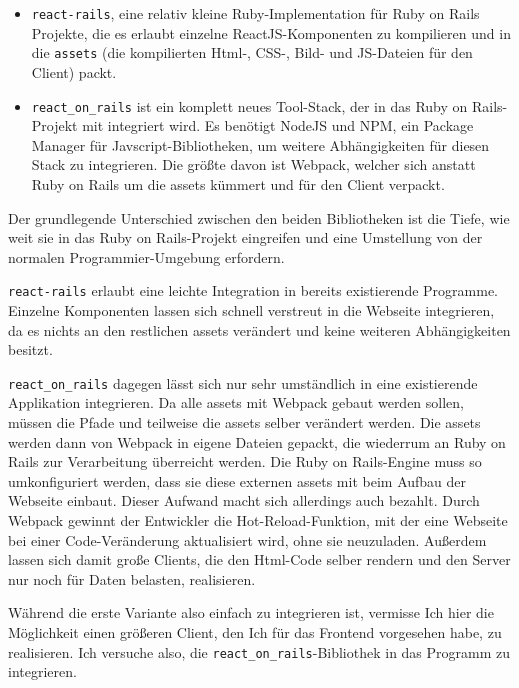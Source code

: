 \documentclass[a4paper,10pt]{scrartcl}
\begin{document}
  \begin{itemize}
    \item \lstinline{react-rails}, eine relativ kleine Ruby-Implementation für
      Ruby on Rails Projekte, die es erlaubt einzelne ReactJS-Komponenten zu
      kompilieren und in die \lstinline{assets} (die kompilierten Html-, CSS-,
      Bild- und JS-Dateien für den Client) packt.
    \item \lstinline{react_on_rails} ist ein komplett neues Tool-Stack, der in
      das Ruby on Rails-Projekt mit integriert wird.
      Es benötigt NodeJS und NPM, ein Package Manager für
      Javscript-Bibliotheken, um weitere Abhängigkeiten für diesen Stack zu
      integrieren.
      Die größte davon ist Webpack, welcher sich anstatt Ruby on Rails um die
      assets kümmert und für den Client verpackt.
  \end{itemize}

  Der grundlegende Unterschied zwischen den beiden Bibliotheken ist die Tiefe,
  wie weit sie in das Ruby on Rails-Projekt eingreifen und eine Umstellung von
  der normalen Programmier-Umgebung erfordern.

  \lstinline{react-rails} erlaubt eine leichte Integration in bereits
  existierende Programme.
  Einzelne Komponenten lassen sich schnell verstreut in die Webseite
  integrieren, da es nichts an den restlichen assets verändert und keine
  weiteren Abhängigkeiten besitzt.

  \lstinline{react_on_rails} dagegen lässt sich nur sehr umständlich in eine
  existierende Applikation integrieren.
  Da alle assets mit Webpack gebaut werden sollen, müssen die Pfade und
  teilweise die assets selber verändert werden.
  Die assets werden dann von Webpack in eigene Dateien gepackt, die wiederrum
  an Ruby on Rails zur Verarbeitung überreicht werden.
  Die Ruby on Rails-Engine muss so umkonfiguriert werden, dass sie diese
  externen assets mit beim Aufbau der Webseite einbaut.
  Dieser Aufwand macht sich allerdings auch bezahlt.
  Durch Webpack gewinnt der Entwickler die Hot-Reload-Funktion, mit der eine
  Webseite bei einer Code-Veränderung aktualisiert wird, ohne sie neuzuladen.
  Außerdem lassen sich damit große Clients, die den Html-Code selber rendern
  und den Server nur noch für Daten belasten, realisieren.

  Während die erste Variante also einfach zu integrieren ist, vermisse Ich hier
  die Möglichkeit einen größeren Client, den Ich für das Frontend vorgesehen
  habe, zu realisieren.
  Ich versuche also, die \lstinline{react_on_rails}-Bibliothek in das Programm
  zu integrieren.
\end{document}
